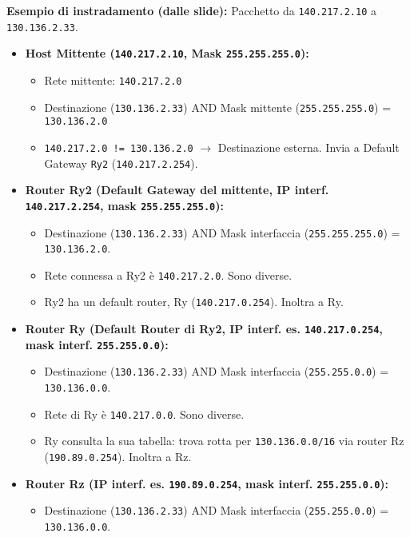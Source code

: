\textbf{Esempio di instradamento (dalle slide):} Pacchetto da \texttt{140.217.2.10} a \texttt{130.136.2.33}.
\begin{itemize}
    \item \textbf{Host Mittente (\texttt{140.217.2.10}, Mask \texttt{255.255.255.0}):}
    \begin{itemize}
        \item Rete mittente: \texttt{140.217.2.0}
        \item Destinazione (\texttt{130.136.2.33}) AND Mask mittente (\texttt{255.255.255.0}) = \texttt{130.136.2.0}
        \item \texttt{140.217.2.0 != 130.136.2.0} $\rightarrow$ Destinazione esterna. Invia a Default Gateway \texttt{Ry2} (\texttt{140.217.2.254}).
    \end{itemize}
    \item \textbf{Router Ry2 (Default Gateway del mittente, IP interf. \texttt{140.217.2.254}, mask \texttt{255.255.255.0}):}
    \begin{itemize}
        \item Destinazione (\texttt{130.136.2.33}) AND Mask interfaccia (\texttt{255.255.255.0}) = \texttt{130.136.2.0}.
        \item Rete connessa a Ry2 è \texttt{140.217.2.0}. Sono diverse.
        \item Ry2 ha un default router, Ry (\texttt{140.217.0.254}). Inoltra a Ry.
    \end{itemize}
    \item \textbf{Router Ry (Default Router di Ry2, IP interf. es. \texttt{140.217.0.254}, mask interf. \texttt{255.255.0.0}):}
    \begin{itemize}
        \item Destinazione (\texttt{130.136.2.33}) AND Mask interfaccia (\texttt{255.255.0.0}) = \texttt{130.136.0.0}.
        \item Rete di Ry è \texttt{140.217.0.0}. Sono diverse.
        \item Ry consulta la sua tabella: trova rotta per \texttt{130.136.0.0/16} via router Rz (\texttt{190.89.0.254}). Inoltra a Rz.
    \end{itemize}
    \item \textbf{Router Rz (IP interf. es. \texttt{190.89.0.254}, mask interf. \texttt{255.255.0.0}):}
    \begin{itemize}
        \item Destinazione (\texttt{130.136.2.33}) AND Mask interfaccia (\texttt{255.255.0.0}) = \texttt{130.136.0.0}.

\end{itemize}
\end{itemize}
